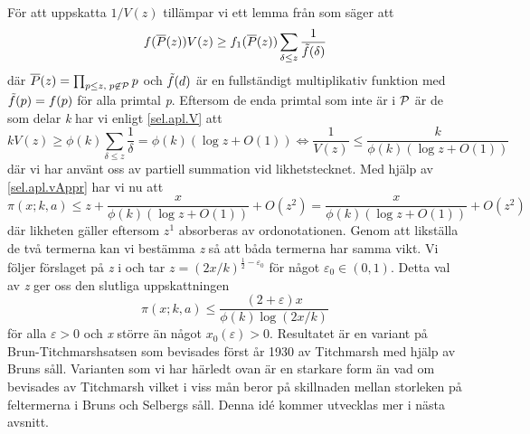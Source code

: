För att uppskatta \(1/V(z)\) tillämpar vi ett lemma från \cite[Lemma 7.2.3]{cojocarumurty} som säger att
\begin{equation}
    f(\overline{P}(z))V(z) \geq f_1(\overline{P}(z))\sum_{\delta \leq z}\frac{1}{\Tilde{f}(\delta)}\label{sel.apl.V}
\end{equation}
där \(\overline{P}(z) = \prod_{p\leq z,\; p \not \in \P}p\) och \(\Tilde{f}(d)\) är en fullständigt multiplikativ funktion med \(\Tilde{f}(p) = f(p)\) för alla primtal \textit{p}. 
Eftersom de enda primtal som inte är i \(\P\) är de som delar \textit{k} har vi enligt \eqref{sel.apl.V} att 
\begin{equation}
    kV(z) \geq \phi(k) \sum_{\delta \leq z}\frac{1}{\delta} = \phi(k)(\log z + O(1)) \iff \frac{1}{V(z)} \leq \frac{k}{\phi(k)(\log z + O(1))}\label{sel.apl.vAppr}
\end{equation}
där vi har använt oss av partiell summation vid likhetstecknet. 
Med hjälp av \eqref{sel.apl.vAppr} har vi nu att
\begin{equation}
     \pi(x;k,a) \leq z + \frac{x}{\phi(k)(\log z + O(1))} + O(z^2) = \frac{x}{\phi(k)(\log z + O(1))} + O(z^2)\nonumber
\end{equation}
där likheten gäller eftersom \(z^1\) absorberas av ordonotationen. 
Genom att likställa de två termerna kan vi bestämma \textit{z} så att båda termerna har samma vikt. Vi följer förslaget på \textit{z} i \cite[s. 127]{cojocarumurty} och tar \(z = (2x/k)^{\frac{1}{2}-\varepsilon_0}\) för något \(\varepsilon_0\in(0, 1)\). Detta val av \textit{z} ger oss den slutliga uppskattningen
\begin{equation}
    \pi(x;k,a) \leq \frac{(2+\varepsilon)x}{\phi(k)\log(2x/k)}\nonumber
\end{equation}
för alla \(\varepsilon > 0\) och \textit{x} större än något \(x_0(\varepsilon) >0\). 
Resultatet är en variant på Brun-Titchmarshsatsen som bevisades först år 1930 av Titchmarsh \cite{BrunTitch} med hjälp av Bruns såll.
Varianten som vi har härledt ovan är en starkare form än vad om bevisades av Titchmarsh vilket i viss mån beror på skillnaden mellan storleken på feltermerna i Bruns och Selbergs såll.
Denna idé kommer utvecklas mer i nästa avsnitt.